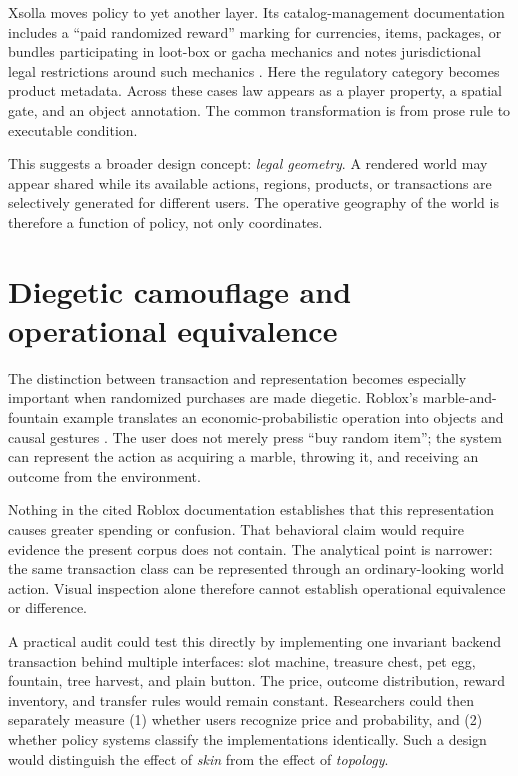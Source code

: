 \documentclass[11pt]{article}
\begin{document}
Xsolla moves policy to yet another layer. Its catalog-management documentation includes a ``paid randomized reward'' marking for currencies, items, packages, or bundles participating in loot-box or gacha mechanics and notes jurisdictional legal restrictions around such mechanics \parencite{xsolla_catalog_randomized_reward}. Here the regulatory category becomes product metadata. Across these cases law appears as a player property, a spatial gate, and an object annotation. The common transformation is from prose rule to executable condition.

This suggests a broader design concept: \emph{legal geometry}. A rendered world may appear shared while its available actions, regions, products, or transactions are selectively generated for different users. The operative geography of the world is therefore a function of policy, not only coordinates.

\section{Diegetic camouflage and operational equivalence}
The distinction between transaction and representation becomes especially important when randomized purchases are made diegetic. Roblox's marble-and-fountain example translates an economic-probabilistic operation into objects and causal gestures \parencite{roblox_marble_fountain_2026}. The user does not merely press ``buy random item''; the system can represent the action as acquiring a marble, throwing it, and receiving an outcome from the environment.

Nothing in the cited Roblox documentation establishes that this representation causes greater spending or confusion. That behavioral claim would require evidence the present corpus does not contain. The analytical point is narrower: the same transaction class can be represented through an ordinary-looking world action. Visual inspection alone therefore cannot establish operational equivalence or difference.

A practical audit could test this directly by implementing one invariant backend transaction behind multiple interfaces: slot machine, treasure chest, pet egg, fountain, tree harvest, and plain button. The price, outcome distribution, reward inventory, and transfer rules would remain constant. Researchers could then separately measure (1) whether users recognize price and probability, and (2) whether policy systems classify the implementations identically. Such a design would distinguish the effect of \emph{skin} from the effect of \emph{topology}.
\end{document}
